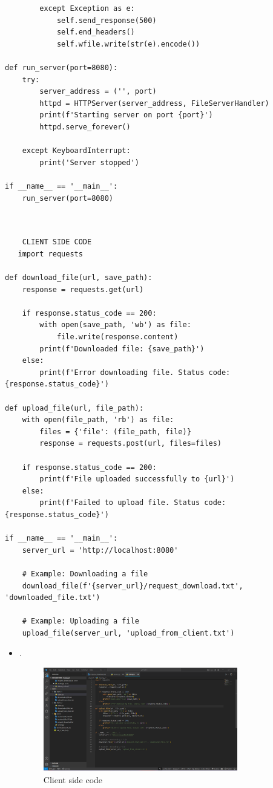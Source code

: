 \documentclass[11pt]{article}
\begin{document}
\begin{itemize}
\begin{verbatim}
        except Exception as e:
            self.send_response(500)
            self.end_headers()
            self.wfile.write(str(e).encode())

def run_server(port=8080):
    try:
        server_address = ('', port)
        httpd = HTTPServer(server_address, FileServerHandler)
        print(f'Starting server on port {port}')
        httpd.serve_forever()

    except KeyboardInterrupt:
        print('Server stopped')

if __name__ == '__main__':
    run_server(port=8080)

   

\end{verbatim}
    \begin{verbatim}
    CLIENT SIDE CODE
   import requests

def download_file(url, save_path):
    response = requests.get(url)
    
    if response.status_code == 200:
        with open(save_path, 'wb') as file:
            file.write(response.content)
        print(f'Downloaded file: {save_path}')
    else:
        print(f'Error downloading file. Status code: {response.status_code}')

def upload_file(url, file_path):
    with open(file_path, 'rb') as file:
        files = {'file': (file_path, file)}
        response = requests.post(url, files=files)

    if response.status_code == 200:
        print(f'File uploaded successfully to {url}')
    else:
        print(f'Failed to upload file. Status code: {response.status_code}')

if __name__ == '__main__':
    server_url = 'http://localhost:8080'

    # Example: Downloading a file
    download_file(f'{server_url}/request_download.txt', 'downloaded_file.txt')

    # Example: Uploading a file
    upload_file(server_url, 'upload_from_client.txt')

\end{verbatim}

\begin{itemize}
    \item \textbf{}
    
  . 
    \begin{figure}[H]
        \centering
        \includegraphics[width=0.8\textwidth]{client2.png}
        \caption{Client side code}
        \label{fig:1}
    \end{figure}
    

\end{itemize}
\end{itemize}
\end{document}
